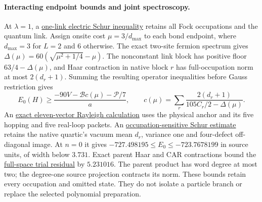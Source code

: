 \paragraph{Interacting endpoint bounds and joint spectroscopy.}
At $\lambda=1$, a
\href{https://github.com/FloatingPragma/observer-patch-holography/blob/main/model/particle_primary_endpoint_bounds/PROOF.md}{one-link electric Schur inequality}
retains all Fock occupations and the quantum link. Assign onsite cost
$\mu=3/d_{\max}$ to each bond endpoint, where $d_{\max}=3$ for $L=2$
and $6$ otherwise. The exact two-site fermion spectrum gives
$\Delta(\mu)=60(\sqrt{\mu^2+1/4}-\mu)$. The nonconstant link block
has positive floor $63/4-\Delta(\mu)$, and Haar contraction in native
block $r$ has full-occupation norm at most $2(d_r+1)$. Summing the
resulting operator inequalities before Gauss restriction gives
\[
 E_0(H)\ge\frac{-90V-\mathcal B c(\mu)-\mathcal P/7}{a},
 \qquad c(\mu)=\sum_r\frac{2(d_r+1)}{105C_r/2-\Delta(\mu)}.
\]
An \href{https://github.com/FloatingPragma/observer-patch-holography/blob/main/model/particle_primary_variational_readout/PROOF.md}{exact eleven-vector Rayleigh calculation}
uses the physical anchor and its five hopping and five real-loop
packets. An
\href{https://github.com/FloatingPragma/observer-patch-holography/blob/main/model/particle_primary_occupation_bound/PROOF.md}{occupation-sensitive Schur estimate}
retains the native quartic's vacuum mean $d_r$, variance one and
four-defect off-diagonal image. At $n=0$ it gives
$-727.498195\le E_0\le-723.7678199$ in source units, of width below
$3.731$. Exact parent Haar and CAR contractions bound the
\href{https://github.com/FloatingPragma/observer-patch-holography/blob/main/model/particle_primary_residual_refinement/PROOF.md}{full-space trial residual}
by $5.231016$. The parent product has word degree at most two; the
degree-one source projection contracts its norm. These bounds retain
every occupation and omitted state. They do not isolate a particle
branch or replace the selected polynomial preparation.

